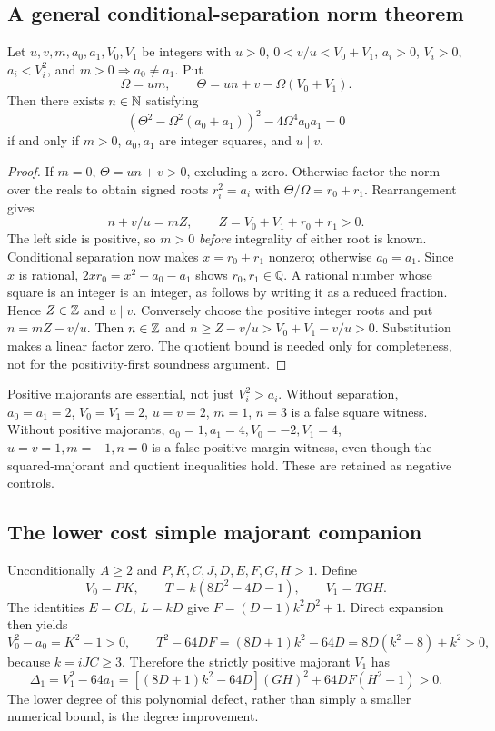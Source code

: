 \subsection{A general conditional-separation norm theorem}
\begin{theorem}\label{thm:conditional}
Let $u,v,m,a_0,a_1,V_0,V_1$ be integers with $u>0$,
$0<v/u<V_0+V_1$, $a_i>0$, $V_i>0$, $a_i<V_i^2$, and
$m>0\Rightarrow a_0\ne a_1$. Put
\[
 \Omega=um,\qquad \Theta=un+v-\Omega(V_0+V_1).
\]
Then there exists $n\in\mathbb N$ satisfying
\[
 (\Theta^2-\Omega^2(a_0+a_1))^2-4\Omega^4a_0a_1=0
\]
if and only if $m>0$, $a_0,a_1$ are integer squares, and $u\mid v$.
\end{theorem}
\begin{proof}
If $m=0$, $\Theta=un+v>0$, excluding a zero. Otherwise factor the norm
over the reals to obtain signed roots $r_i^2=a_i$ with
$\Theta/\Omega=r_0+r_1$. Rearrangement gives
\[
 n+v/u=mZ,\qquad Z=V_0+V_1+r_0+r_1>0.
\]
The left side is positive, so $m>0$ \emph{before} integrality of either
root is known. Conditional separation now makes $x=r_0+r_1$ nonzero;
otherwise $a_0=a_1$. Since $x$ is rational,
$2xr_0=x^2+a_0-a_1$ shows $r_0,r_1\in\mathbb Q$.
A rational number whose square is an integer is an integer, as follows
by writing it as a reduced fraction. Hence $Z\in\mathbb Z$ and $u\mid v$.
Conversely choose the positive integer roots and put $n=mZ-v/u$.
Then $n\in\mathbb Z$ and $n\ge Z-v/u>V_0+V_1-v/u>0$.
Substitution makes a linear factor zero. The quotient bound is needed only
for completeness, not for the positivity-first soundness argument.
\end{proof}
Positive majorants are essential, not just $V_i^2>a_i$. Without separation,
$a_0=a_1=2$, $V_0=V_1=2$, $u=v=2$, $m=1$, $n=3$ is a false square
witness. Without positive majorants, $a_0=1,a_1=4,V_0=-2,V_1=4$,
$u=v=1,m=-1,n=0$ is a false positive-margin witness, even though the
squared-majorant and quotient inequalities hold. These are retained
as negative controls.

\subsection{The lower cost simple majorant companion}
Unconditionally $A\ge2$ and $P,K,C,J,D,E,F,G,H>1$. Define
\[
 V_0=PK,\qquad T=k(8D^2-4D-1),\qquad V_1=TGH.
\]
The identities $E=CL$, $L=kD$ give $F=(D-1)k^2D^2+1$. Direct expansion
then yields
\[
 V_0^2-a_0=K^2-1>0,\qquad
 T^2-64DF=(8D+1)k^2-64D=8D(k^2-8)+k^2>0,
\]
because $k=iJC\ge3$. Therefore the strictly positive majorant $V_1$ has
\[
 \Delta_1=V_1^2-64a_1
 =[(8D+1)k^2-64D](GH)^2+64DF(H^2-1)>0.
\]
The lower degree of this polynomial defect, rather than simply a smaller
numerical bound, is the degree improvement.

